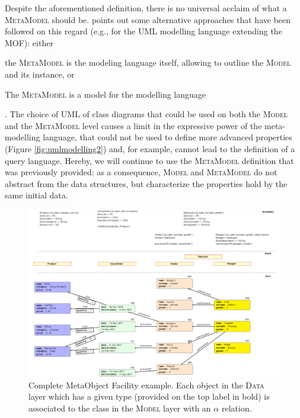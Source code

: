 Despite the aforementioned definition, there is no universal acclaim of what a \textsc{MetaModel} should be. \cite{mathmeta} points out some alternative approaches that have been followed on this regard (e.g., for the UML modelling language \cite{OMG2011a} extending the MOF): either \begin{inlinelist}
 	\item the \textsc{MetaModel} is the modeling language itself, allowing to outline the \textsc{Model} and its instance, or
	\item The \textsc{MetaModel} is a model for the modelling language
 \end{inlinelist}. The choice of UML of class diagrams that could be used on both the \textsc{Model} and the \textsc{MetaModel} level causes a limit in the expressive power of the meta-modelling language, that could not be used to define more advanced properties (Figure \ref{fig:umlmodelling2}) and, for example, cannot lead to the definition of a query language. Hereby, we will continue to use the \textsc{MetaModel} definition that was previously provided: as a consequence, \textsc{Model} and \textsc{MetaModel} do not abstract from the data structures, but characterize the properties hold by the same initial data. %
\begin{figure}
	\centering
	\includegraphics[width=\textheight]{fig/01dataint/umlmodelling}
	\caption{Complete MetaObject Facility example. Each object in the \textsc{Data} layer which has a given type (provided on the top label in bold) is associated to the class in the \textsc{Model} layer with an $\alpha$ relation.}
	\label{fig:umlmodelling}
\end{figure}

